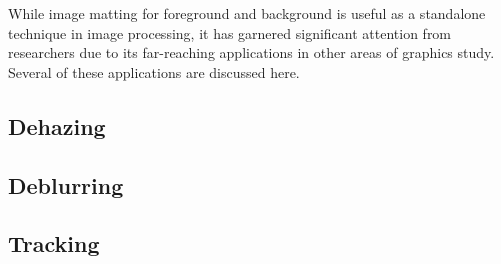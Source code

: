 While image matting for foreground and background is useful as a standalone technique in image processing, it has garnered significant attention from researchers due to its far-reaching applications in other areas of graphics study. Several of these applications are discussed here.

\subsection{Dehazing}

\subsection{Deblurring}
\subsection{Tracking}